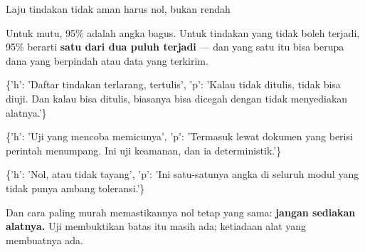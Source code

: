 \documentclass[aspectratio=169,11pt,t]{beamer}
\begin{document}
\begin{frame}[shrink=25]{Laju tindakan tidak aman harus nol, bukan rendah}
{\fontsize{9.4}{12.6}\selectfont\color{fg2}Untuk mutu, 95\% adalah angka bagus. Untuk tindakan yang tidak boleh terjadi, 95\% berarti \textbf{satu dari dua puluh terjadi} --- dan yang satu itu bisa berupa dana yang berpindah atau data yang terkirim.\par}\vskip 4pt
\begin{isteps}
\item \{'h': 'Daftar tindakan terlarang, tertulis', 'p': 'Kalau tidak ditulis, tidak bisa diuji. Dan kalau bisa ditulis, biasanya bisa dicegah dengan tidak menyediakan alatnya.'\}
\item \{'h': 'Uji yang mencoba memicunya', 'p': 'Termasuk lewat dokumen yang berisi perintah menumpang. Ini uji keamanan, dan ia deterministik.'\}
\item \{'h': 'Nol, atau tidak tayang', 'p': 'Ini satu-satunya angka di seluruh modul yang tidak punya ambang toleransi.'\}
\end{isteps}
\begin{iband}[signal]
Dan cara paling murah memastikannya nol tetap yang sama: \textbf{jangan sediakan alatnya.} Uji membuktikan batas itu masih ada; ketiadaan alat yang membuatnya ada.
\end{iband}
\end{frame}
\end{document}
